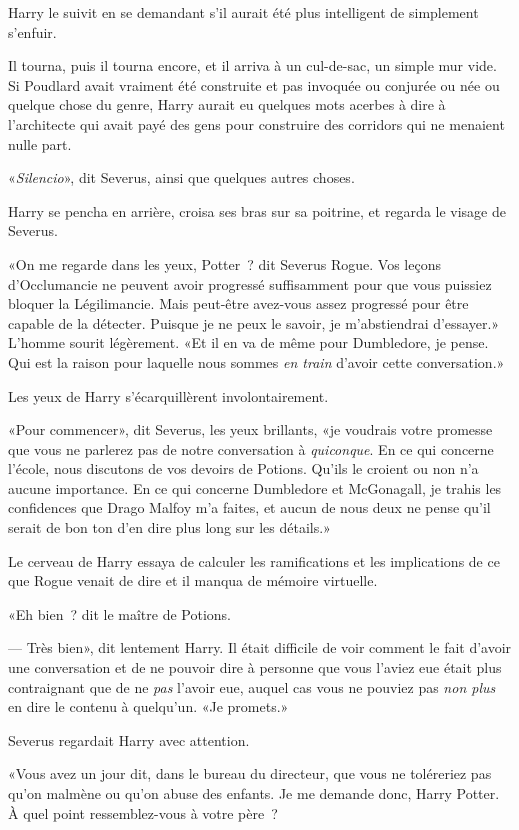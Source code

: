 Harry le suivit en se demandant s'il aurait été plus intelligent de simplement s'enfuir.

Il tourna, puis il tourna encore, et il arriva à un cul-de-sac, un simple mur vide. Si Poudlard avait vraiment été construite et pas invoquée ou conjurée ou née ou quelque chose du genre, Harry aurait eu quelques mots acerbes à dire à l'architecte qui avait payé des gens pour construire des corridors qui ne menaient nulle part.

«\emph{Silencio}», dit Severus, ainsi que quelques autres choses.

Harry se pencha en arrière, croisa ses bras sur sa poitrine, et regarda le visage de Severus.

«On me regarde dans les yeux, Potter~? dit Severus Rogue. Vos leçons d'Occlumancie ne peuvent avoir progressé suffisamment pour que vous puissiez bloquer la Légilimancie. Mais peut-être avez-vous assez progressé pour être capable de la détecter. Puisque je ne peux le savoir, je m'abstiendrai d'essayer.» L'homme sourit légèrement. «Et il en va de même pour Dumbledore, je pense. Qui est la raison pour laquelle nous sommes \emph{en train} d'avoir cette conversation.»

Les yeux de Harry s'écarquillèrent involontairement.

«Pour commencer», dit Severus, les yeux brillants, «je voudrais votre promesse que vous ne parlerez pas de notre conversation à \emph{quiconque}. En ce qui concerne l'école, nous discutons de vos devoirs de Potions. Qu'ils le croient ou non n'a aucune importance. En ce qui concerne Dumbledore et McGonagall, je trahis les confidences que Drago Malfoy m'a faites, et aucun de nous deux ne pense qu'il serait de bon ton d'en dire plus long sur les détails.»

Le cerveau de Harry essaya de calculer les ramifications et les implications de ce que Rogue venait de dire et il manqua de mémoire virtuelle.

«Eh bien~? dit le maître de Potions.

--- Très bien», dit lentement Harry. Il était difficile de voir comment le fait d'avoir une conversation et de ne pouvoir dire à personne que vous l'aviez eue était plus contraignant que de ne \emph{pas} l'avoir eue, auquel cas vous ne pouviez pas \emph{non plus} en dire le contenu à quelqu'un. «Je promets.»

Severus regardait Harry avec attention.

«Vous avez un jour dit, dans le bureau du directeur, que vous ne toléreriez pas qu'on malmène ou qu'on abuse des enfants. Je me demande donc, Harry Potter. À quel point ressemblez-vous à votre père~?

